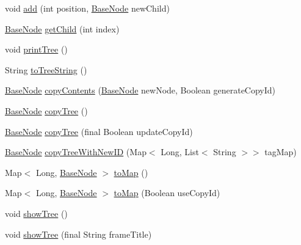 \begin{DoxyCompactItemize}
\item 
void \hyperlink{classit_1_1emarolab_1_1cagg_1_1core_1_1BaseNode_a4f786a60130938990ebb6aea8fbdcfa0}{add} (int position, \hyperlink{classit_1_1emarolab_1_1cagg_1_1core_1_1BaseNode}{Base\-Node} new\-Child)
\item 
\hyperlink{classit_1_1emarolab_1_1cagg_1_1core_1_1BaseNode}{Base\-Node} \hyperlink{classit_1_1emarolab_1_1cagg_1_1core_1_1BaseNode_a60b683e07f93776e3cfa66c0e76168c4}{get\-Child} (int index)
\item 
void \hyperlink{classit_1_1emarolab_1_1cagg_1_1core_1_1BaseNode_a1d04356a5dc33e09db1b33f2899eeabd}{print\-Tree} ()
\item 
String \hyperlink{classit_1_1emarolab_1_1cagg_1_1core_1_1BaseNode_a0a350c0a6c67fa203ae530a55929be43}{to\-Tree\-String} ()
\item 
\hyperlink{classit_1_1emarolab_1_1cagg_1_1core_1_1BaseNode}{Base\-Node} \hyperlink{classit_1_1emarolab_1_1cagg_1_1core_1_1BaseNode_a0384fbfce38913921cfa372606b7f8a6}{copy\-Contents} (\hyperlink{classit_1_1emarolab_1_1cagg_1_1core_1_1BaseNode}{Base\-Node} new\-Node, Boolean generate\-Copy\-Id)
\item 
\hyperlink{classit_1_1emarolab_1_1cagg_1_1core_1_1BaseNode}{Base\-Node} \hyperlink{classit_1_1emarolab_1_1cagg_1_1core_1_1BaseNode_ad94af343d93ea00bdce7c99e759adef9}{copy\-Tree} ()
\item 
\hyperlink{classit_1_1emarolab_1_1cagg_1_1core_1_1BaseNode}{Base\-Node} \hyperlink{classit_1_1emarolab_1_1cagg_1_1core_1_1BaseNode_a7a5b39603380ff3d65f69b2e2d2eba7d}{copy\-Tree} (final Boolean update\-Copy\-Id)
\item 
\hyperlink{classit_1_1emarolab_1_1cagg_1_1core_1_1BaseNode}{Base\-Node} \hyperlink{classit_1_1emarolab_1_1cagg_1_1core_1_1BaseNode_ab040052d71e812c22e4f463a7778edc8}{copy\-Tree\-With\-New\-I\-D} (Map$<$ Long, List$<$ String $>$$>$ tag\-Map)
\item 
Map$<$ Long, \hyperlink{classit_1_1emarolab_1_1cagg_1_1core_1_1BaseNode}{Base\-Node} $>$ \hyperlink{classit_1_1emarolab_1_1cagg_1_1core_1_1BaseNode_ac8ec9d738aab3e71ed4953d5c04ddd32}{to\-Map} ()
\item 
Map$<$ Long, \hyperlink{classit_1_1emarolab_1_1cagg_1_1core_1_1BaseNode}{Base\-Node} $>$ \hyperlink{classit_1_1emarolab_1_1cagg_1_1core_1_1BaseNode_a2b945f955a5a0151dd3d9c832cfc157f}{to\-Map} (Boolean use\-Copy\-Id)
\item 
void \hyperlink{classit_1_1emarolab_1_1cagg_1_1core_1_1BaseNode_a9d8a1fbd1428ce47a30247bba94ddd25}{show\-Tree} ()
\item 
void \hyperlink{classit_1_1emarolab_1_1cagg_1_1core_1_1BaseNode_a5ed645f243d1555f06db33e1b57e9f3c}{show\-Tree} (final String frame\-Title)
\end{DoxyCompactItemize}
